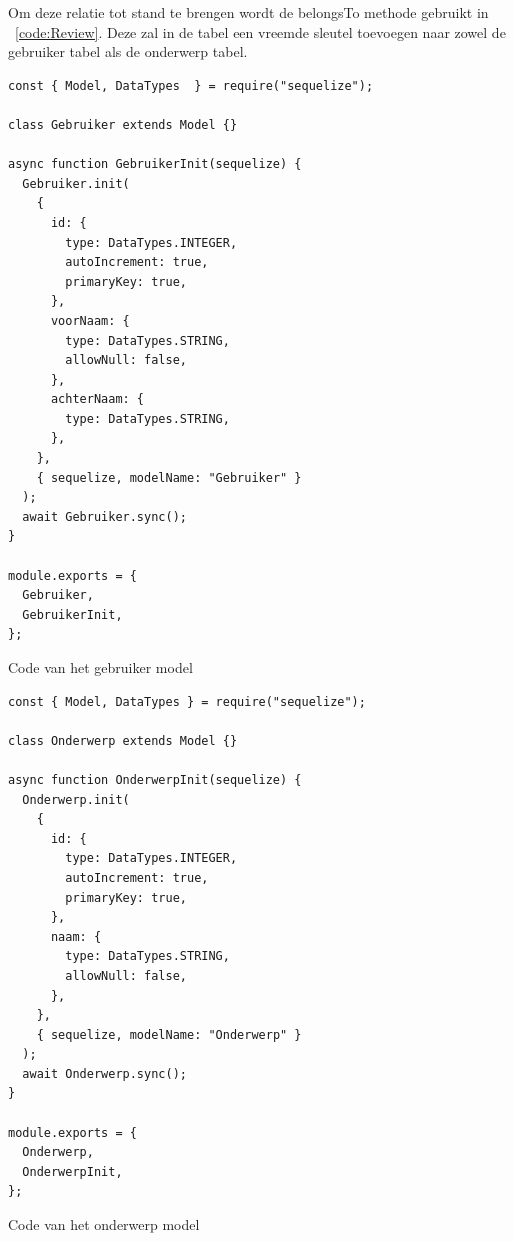 Om deze relatie tot stand te brengen wordt de belongsTo methode gebruikt in ~\ref{code:Review}. 
Deze zal in de tabel een vreemde sleutel toevoegen naar zowel de gebruiker tabel als de onderwerp tabel. 
\begin{listing}[H]
  \centering
  \begin{verbatim}
const { Model, DataTypes  } = require("sequelize");

class Gebruiker extends Model {}

async function GebruikerInit(sequelize) {
  Gebruiker.init(
    {
      id: {
        type: DataTypes.INTEGER,
        autoIncrement: true,
        primaryKey: true,
      },
      voorNaam: {
        type: DataTypes.STRING,
        allowNull: false,
      },
      achterNaam: {
        type: DataTypes.STRING,
      },
    },
    { sequelize, modelName: "Gebruiker" }
  );
  await Gebruiker.sync();
}

module.exports = {
  Gebruiker,
  GebruikerInit,
};
\end{verbatim}
\caption{\label{code:User}Code van het gebruiker model}
\end{listing}

\begin{listing}[H]
  \centering
  \begin{verbatim}
const { Model, DataTypes } = require("sequelize");

class Onderwerp extends Model {}

async function OnderwerpInit(sequelize) {
  Onderwerp.init(
    {
      id: {
        type: DataTypes.INTEGER,
        autoIncrement: true,
        primaryKey: true,
      },
      naam: {
        type: DataTypes.STRING,
        allowNull: false,
      },
    },
    { sequelize, modelName: "Onderwerp" }
  );
  await Onderwerp.sync();
}

module.exports = {
  Onderwerp,
  OnderwerpInit,
};
\end{verbatim}
\caption{\label{code:Subject}Code van het onderwerp model}
\end{listing}

